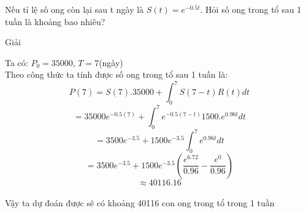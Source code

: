 \documentclass[12pt,a4paper]{article}
\begin{document}
\begin{enumerate}[a/]
\begin{flushleft}
		      Nếu tỉ lệ số ong còn lại sau t ngày là $S(t) = e^{-0.5t}$.
		      Hỏi số ong trong tổ sau 1 tuần là khoảng bao nhiêu?
	      \end{flushleft}
	      \begin{center}
		      Giải
	      \end{center}
	      \begin{flushleft}
		      Ta có: $P_0=35000$, $T=7$(ngày)\\
		      Theo công thức ta tính được số ong trong tổ sau 1 tuần là: %
		      $$P(7)=S(7).35000 +\int_0^7S(7-t)R(t)dt$$
		      $$=35000e^{-0.5(7)}+ \int_0^7e^{-0.5(7-t)}1500.e^{0.96t}dt$$
		      $$=3500e^{-3.5}+1500e^{-3.5}\int_0^7e^{0.96t}dt$$
		      $$=3500e^{-3.5}+1500e^{-3.5}(\frac{e^{6.72}}{0.96}-\frac{e^0}{0.96})$$
		      $$\approx40116.16$$\\
		      Vậy ta dự đoán được sẽ có khoảng 40116 con ong trong tổ trong 1 tuần
	      \end{flushleft}
\end{enumerate}

\newpage
\end{document}
